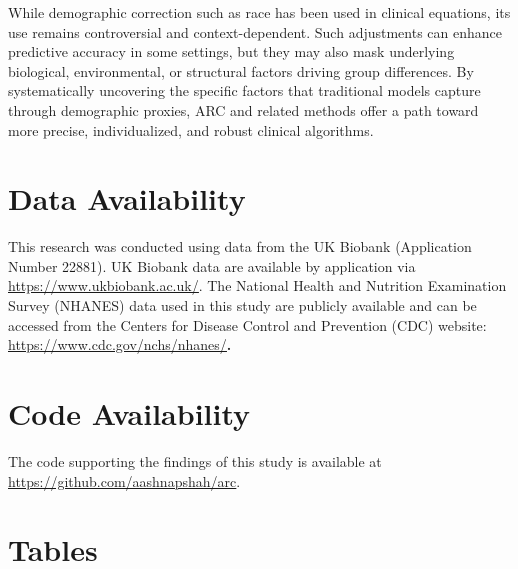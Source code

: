 \documentclass[10pt]{extarticle}
\begin{document}
While demographic correction such as race has been used in clinical equations, its use remains controversial and context-dependent\cite{Pierson2024-kv,Vyas2020-ht,Coots2025-sq,Gouveia2025-pi}. Such adjustments can enhance predictive accuracy in some settings, but they may also mask underlying biological, environmental, or structural factors driving group differences. By systematically uncovering the specific factors that traditional models capture through demographic proxies, ARC and related methods offer a path toward more precise, individualized, and robust clinical algorithms.

\section{Data Availability}

This research was conducted using data from the UK Biobank (Application Number 22881). UK Biobank data are available by application via \href{https://www.ukbiobank.ac.uk/}{\underline{https://www.ukbiobank.ac.uk/}}. The National Health and Nutrition Examination Survey (NHANES) data used in this study are publicly available and can be accessed from the Centers for Disease Control and Prevention (CDC) website: \href{https://www.cdc.gov/nchs/nhanes/?CDC_AAref_Val=https://www.cdc.gov/nchs/nhanes/index.htm}{\underline{https://www.cdc.gov/nchs/nhanes/}}\textbf{.}

\section{Code Availability}
The code supporting the findings of this study is available at \href{https://github.com/aashnapshah/arc_pft}{\underline{https://github.com/aashnapshah/arc}}.

\clearpage


\clearpage

\section*{Tables}
\renewcommand{\tablename}{Table}
\renewcommand{\thetable}{\arabic{table}}
\end{document}
